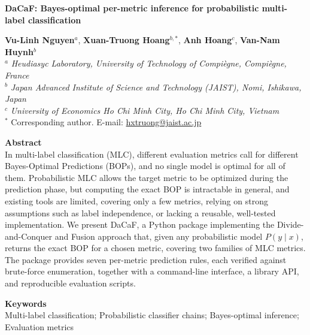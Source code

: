\documentclass[11pt, letterpaper]{article}
\begin{document}
\noindent
{\Large \textbf{DaCaF: Bayes-optimal per-metric inference for probabilistic
multi-label classification}}
\vskip0.5cm

\noindent
\textbf{Vu-Linh Nguyen}$^{a}$, \textbf{Xuan-Truong Hoang}$^{b,*}$,
\textbf{Anh Hoang}$^{c}$, \textbf{Van-Nam Huynh}$^{b}$\\[2pt]
\noindent
$^{a}$ \textit{Heudiasyc Laboratory, University of Technology of Compi\`egne, Compi\`egne, France}\\
$^{b}$ \textit{Japan Advanced Institute of Science and Technology (JAIST), Nomi, Ishikawa, Japan}\\
$^{c}$ \textit{University of Economics Ho Chi Minh City, Ho Chi Minh City, Vietnam}\\[2pt]
\noindent
$^{*}$ Corresponding author. E-mail: \href{mailto:hxtruong@jaist.ac.jp}{hxtruong@jaist.ac.jp}\\
\vskip0.5cm

\noindent
\textbf{Abstract}\\
In multi-label classification (MLC), different evaluation metrics call for different
Bayes-Optimal Predictions (BOPs), and no single model is optimal for all of them.
Probabilistic MLC allows the target metric to be optimized during the prediction phase,
but computing the exact BOP is intractable in general, and existing tools are
limited, covering only a few metrics, relying on strong assumptions such as label
independence, or lacking a reusable, well-tested implementation. We present DaCaF, a
Python package implementing the Divide-and-Conquer and Fusion approach that, given any
probabilistic model $P(y\mid x)$, returns the exact BOP for a chosen metric, covering two
families of MLC metrics. The package provides seven per-metric prediction rules, each
verified against brute-force enumeration, together with a command-line interface, a
library API, and reproducible evaluation scripts.
\vskip0.5cm

\noindent
\textbf{Keywords}\\
Multi-label classification; Probabilistic classifier chains; Bayes-optimal inference;
Evaluation metrics
\vskip0.5cm
\newpage
\end{document}
